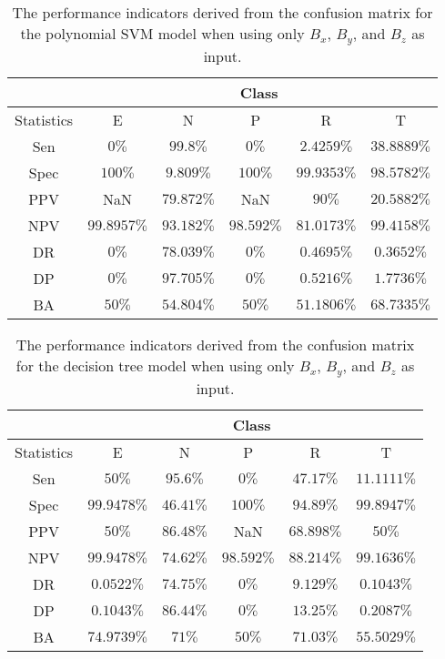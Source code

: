 \begin{table}[!ht]
	\centering
	\begin{tabular}{|c|c|c|c|c|c|}
		\hline
		 & \multicolumn{5}{c|}{Class} \\ \hline
		Statistics & E & N & P & R & T \\ \hline
		Sen & $0\%$ & $99.8\%$ & $0\%$ & $2.4259\%$ & $38.8889\%$ \\ \hline
		Spec & $100\%$ & $9.809\%$ & $100\%$ & $99.9353\%$ & $98.5782\%$ \\ \hline
		PPV & NaN & $79.872\%$ & NaN & $90\%$ & $20.5882\%$ \\ \hline
		NPV & $99.8957\%$ & $93.182\%$ & $98.592\%$ & $81.0173\%$ & $99.4158\%$ \\ \hline
		DR & $0\%$ & $78.039\%$ & $0\%$ & $0.4695\%$ & $0.3652\%$ \\ \hline
		DP & $0\%$ & $97.705\%$ & $0\%$ & $0.5216\%$ & $1.7736\%$ \\ \hline
		BA & $50\%$ & $54.804\%$ & $50\%$ & $51.1806\%$ & $68.7335\%$ \\ \hline
	\end{tabular}
	\caption{The performance indicators derived from the confusion matrix for the polynomial SVM model when using only $B_{x}$, $B_{y}$, and $B_{z}$ as input.}
	\label{tab:cs:reverse:coord:svmPoly}
\end{table}

\begin{table}[!ht]
	\centering
	\begin{tabular}{|c|c|c|c|c|c|}
		\hline
		 & \multicolumn{5}{c|}{Class} \\ \hline
		Statistics & E & N & P & R & T \\ \hline
		Sen & $50\%$ & $95.6\%$ & $0\%$ & $47.17\%$ & $11.1111\%$ \\ \hline
		Spec & $99.9478\%$ & $46.41\%$ & $100\%$ & $94.89\%$ & $99.8947\%$ \\ \hline
		PPV & $50\%$ & $86.48\%$ & NaN & $68.898\%$ & $50\%$ \\ \hline
		NPV & $99.9478\%$ & $74.62\%$ & $98.592\%$ & $88.214\%$ & $99.1636\%$ \\ \hline
		DR & $0.0522\%$ & $74.75\%$ & $0\%$ & $9.129\%$ & $0.1043\%$ \\ \hline
		DP & $0.1043\%$ & $86.44\%$ & $0\%$ & $13.25\%$ & $0.2087\%$ \\ \hline
		BA & $74.9739\%$ & $71\%$ & $50\%$ & $71.03\%$ & $55.5029\%$ \\ \hline
	\end{tabular}
	\caption{The performance indicators derived from the confusion matrix for the decision tree model when using only $B_{x}$, $B_{y}$, and $B_{z}$ as input.}
	\label{tab:cs:reverse:coord:C5.0}
\end{table}

